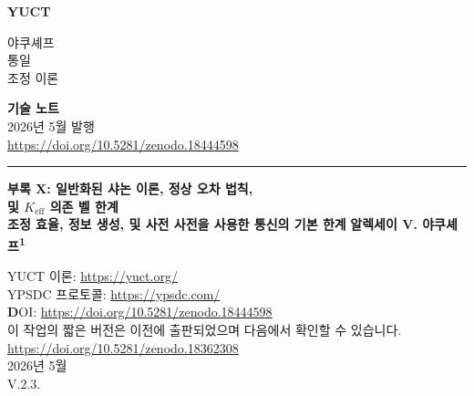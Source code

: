 \documentclass[12pt,a4paper]{article}
\newcommand{\makeheader}{%
	\noindent
	\begin{minipage}{0.17\textwidth}
		\raggedright
		{\sffamily\bfseries\color{skyblue}\fontsize{46}{46}\selectfont YUCT}%
	\end{minipage}%
	\hspace{30pt}
	\begin{minipage}{0.32\textwidth}
		\raggedright
		{\sffamily\fontsize{11}{13}\selectfont 야쿠셰프\\ 통일\\ 조정 이론}%
	\end{minipage}%
	\hfill
	\begin{minipage}{0.38\textwidth}
		\raggedleft
		{\sffamily\bfseries 기술 노트}\\ 
		{\sffamily 2026년 5월 발행}\\ 
		{\sffamily\footnotesize \url{https://doi.org/10.5281/zenodo.18444598}}%
	\end{minipage}
	\par\vspace{5pt}
	\noindent\textcolor{gold}{\rule{\textwidth}{1.6pt}}
	\par\vspace{0pt}
}
\begin{document}
	\thispagestyle{firstpage}
	\makeheader
	
	\begin{titlepage}
		\begin{center}
			\vspace*{1cm}
			\Huge\textbf{부록 X: 일반화된 샤논 이론, 정상 오차 법칙,\\ 및 \(K_{\mathrm{eff}}\) 의존 벨 한계} \\
			\vspace{0.5cm}
			\Large\textbf{조정 효율, 정보 생성, 및 사전 사전을 사용한 통신의 기본 한계}
			\vspace{1.5cm}
			\Large\textbf{알렉세이 V. 야쿠셰프\textsuperscript{1}}
			
			YUCT 이론: \url{https://yuct.org/}\\
			YPSDC 프로토콜: \url{https://ypsdc.com/}\\
			\vspace{2cm}
			\textbf DOI: \url{https://doi.org/10.5281/zenodo.18444598}\\
			\vspace{1cm}
			\large 
			이 작업의 짧은 버전은 이전에 출판되었으며 다음에서 확인할 수 있습니다.\\
			\url{https://doi.org/10.5281/zenodo.18362308}\\
			\vspace{1cm}
			2026년 5월 \\ \large V.2.3.
			\vspace{2cm}
			\begin{minipage}{0.9\textwidth}
				\begin{abstract}
					\noindent
					본 부록은 YPSDC 프로토콜의 일반화된 정보 이론을 Yakushev Unified Coordination Theory (YUCT)의 나머지 부분과 완전히 일치시킨다. 보편 오차 법칙은 \textbf{정상 멱법칙 형태}
					\[
					\varepsilon = \kappa_c \, \alpha \, K_{\mathrm{eff}}^{-\beta},
					\qquad \beta = \frac{2}{3},\quad \kappa_c = \frac{1}{3},
					\]
					를 취하며, 부록 Y의 미시적 유도, 부록 L의 경험적 검증, 그리고 1차 대수적 루프 \(S_{\mathrm{odd}}+S_{\mathrm{even}}=2\)의 폐쇄와 일치한다. 이 단일 법칙으로부터 일반화된 벨 부등식
					\[
					S(K_{\mathrm{eff}}) = 2 + \bigl(2\sqrt{2}-2\bigr)\,
					\bigl(1 - 2\kappa_c\alpha K_{\mathrm{eff}}^{-\beta}\bigr),
					\]
					을 유도하며, 이는 \(K_{\mathrm{eff}}=1\)에서 고전적 국소 실재론 한계 \(S=2\)를, \(K_{\mathrm{eff}}\to\infty\)에서 치렐슨 한계 \(S=2\sqrt{2}\)를 재현한다. 이전의 대수적 변형 \(\varepsilon\propto(\ln K_{\mathrm{eff}})^{2/3}\)은 물리적으로 동기가 부족하고 YUCT의 핵심 구조와 일치하지 않아 명시적으로 폐기된다. \(\varepsilon(K_{\mathrm{eff}})\)의 함수 형태에 의존하는 모든 섹션 - 유용 조정 용량, 최적 사전 크기, 열역학적 효율, 콜모고로프 복잡도 한계, 의미 생성으로의 상전이 - 이 그에 따라 갱신되었다. 따라서 부록 X의 현재 버전은 조정 효율, 채널 용량, 양자 상관관계, 그리고 사전의 열역학에 대한 통일된 매개변수-없는 기술을 제공한다.

\end{abstract}
\end{minipage}
\end{center}
\end{titlepage}
\end{document}
